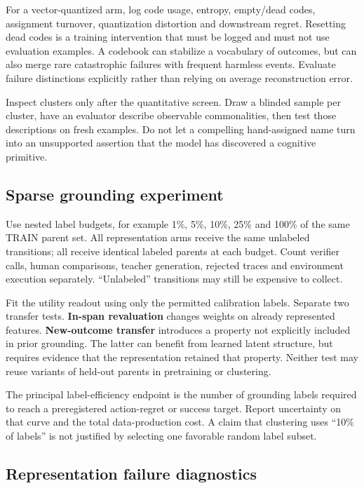 \documentclass[
  11pt,
  a4paper,
]{article}
\begin{document}
For a vector-quantized arm, log code usage, entropy, empty/dead codes,
assignment turnover, quantization distortion and downstream regret.
Resetting dead codes is a training intervention that must be logged and
must not use evaluation examples. A codebook can stabilize a vocabulary
of outcomes, but can also merge rare catastrophic failures with frequent
harmless events. Evaluate failure distinctions explicitly rather than
relying on average reconstruction error.

Inspect clusters only after the quantitative screen. Draw a blinded
sample per cluster, have an evaluator describe observable commonalities,
then test those descriptions on fresh examples. Do not let a compelling
hand-assigned name turn into an unsupported assertion that the model has
discovered a cognitive primitive.

\subsection{Sparse grounding
experiment}\label{sparse-grounding-experiment}

Use nested label budgets, for example 1\%, 5\%, 10\%, 25\% and 100\% of
the same TRAIN parent set. All representation arms receive the same
unlabeled transitions; all receive identical labeled parents at each
budget. Count verifier calls, human comparisons, teacher generation,
rejected traces and environment execution separately. ``Unlabeled''
transitions may still be expensive to collect.

Fit the utility readout using only the permitted calibration labels.
Separate two transfer tests. \textbf{In-span revaluation} changes
weights on already represented features. \textbf{New-outcome transfer}
introduces a property not explicitly included in prior grounding. The
latter can benefit from learned latent structure, but requires evidence
that the representation retained that property. Neither test may reuse
variants of held-out parents in pretraining or clustering.

The principal label-efficiency endpoint is the number of grounding
labels required to reach a preregistered action-regret or success
target. Report uncertainty on that curve and the total data-production
cost. A claim that clustering uses ``10\% of labels'' is not justified
by selecting one favorable random label subset.

\subsection{Representation failure
diagnostics}\label{representation-failure-diagnostics}
\end{document}
